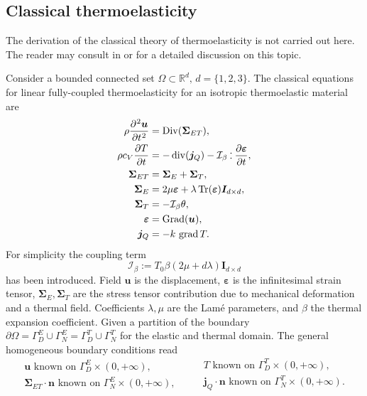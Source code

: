 \subsection{Classical thermoelasticity}
The derivation of the classical theory of thermoelasticity is not carried out here. The reader may consult in \cite[Chapter 1]{hetnarski2009thermal} or \cite[Chapter 8]{abeyaratne2012notes} for a detailed discussion on this topic. 

Consider a bounded connected set $\Omega \subset \mathbb{R}^d, \, d=\{1,2,3\}$. The classical equations for linear fully-coupled thermoelasticity for an isotropic thermoelastic material are \cite{carlson1973,biot1956thermoelasticity}
\begin{equation}\label{eq:sysThElas}
\begin{aligned}
\displaystyle \rho \diffp[2]{\bm{u}}{t} &= \Div(\bm{\Sigma}_{ET}) , \\
\displaystyle \rho c_V \diffp{T}{t} &= -\div(\bm{j}_Q) - \mathcal{I}_\beta \cddot \displaystyle\diffp{\bm{\varepsilon}}{t}, \\
\bm{\Sigma}_{ET} &= \bm{\Sigma}_E + \bm{\Sigma}_{T}, \\
\bm{\Sigma}_E &= 2\mu \bm{\varepsilon} + \lambda \Tr(\bm{\varepsilon}) \bm{I}_{d\times d}, \\
\bm{\Sigma}_T &= - \mathcal{I}_\beta \theta,  \\
\bm{\varepsilon} &= \Grad(\bm{u}), \\
\bm{j}_Q &= -k \, \grad T.
\end{aligned}
\end{equation}
For simplicity  the coupling term
\[\mathcal{I}_\beta:=T_0 \beta(2\mu + d \lambda)\bm{I}_{d\times d} \]
has been introduced. Field $\bm{u}$ is the displacement, $\bm{\varepsilon}$ is the infinitesimal strain tensor, $\bm{\Sigma}_E, \bm{\Sigma}_T$ are the stress tensor contribution due to mechanical deformation and a thermal field. Coefficients $\lambda, \mu$ are the Lam\'e parameters,  and $\beta$ the thermal expansion coefficient. Given a partition of the boundary $\partial \Omega = \Gamma_D^E \cup \Gamma_N^E = \Gamma_D^T \cup \Gamma_N^T$ for the elastic and thermal domain. The general homogeneous boundary conditions read 
\begin{equation}
\begin{aligned}
\bm{u} \text{ known on } \Gamma_D^E \times (0, +\infty), \\
\bm{\Sigma}_{ET} \cdot \bm{n} \text{ known on } \Gamma_N^E \times (0, +\infty), 
\end{aligned} \qquad
\begin{aligned}
T \text{ known on } \Gamma_D^T \times (0, +\infty), \\
\bm{j}_Q \cdot \bm{n} \text{ known on } \Gamma_N^T \times (0, +\infty).
\end{aligned}
\end{equation}

